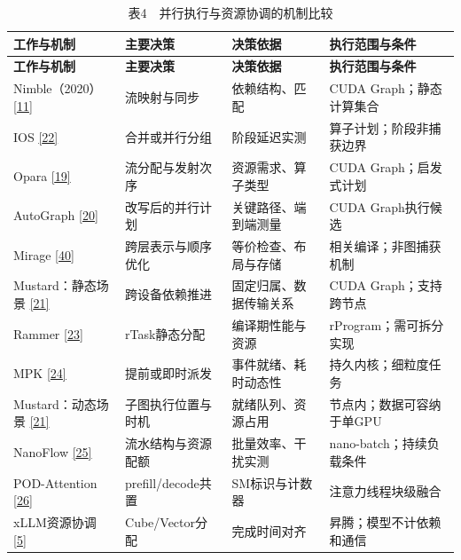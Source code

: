 \documentclass[UTF8,11pt,fontset=windows]{ctexart}
\begin{document}
\begingroup\small
\begin{longtable}[]{@{}>{\raggedright\arraybackslash}p{}>{\raggedright\arraybackslash}p{}>{\raggedright\arraybackslash}p{}>{\raggedright\arraybackslash}p{}@{}}
\caption{表4　并行执行与资源协调的机制比较}\tabularnewline
\toprule
\textbf{工作与机制} & \textbf{主要决策} & \textbf{决策依据} & \textbf{执行范围与条件} \\
\midrule
\endfirsthead
\toprule
\textbf{工作与机制} & \textbf{主要决策} & \textbf{决策依据} & \textbf{执行范围与条件} \\
\midrule
\endhead
Nimble（2020）\protect\hyperlink{ref-11}{{[}11{]}} & 流映射与同步 & 依赖结构、匹配 & CUDA Graph；静态计算集合 \\
IOS \protect\hyperlink{ref-22}{{[}22{]}} & 合并或并行分组 & 阶段延迟实测 & 算子计划；阶段非捕获边界 \\
Opara \protect\hyperlink{ref-19}{{[}19{]}} & 流分配与发射次序 & 资源需求、算子类型 & CUDA Graph；启发式计划 \\
AutoGraph \protect\hyperlink{ref-20}{{[}20{]}} & 改写后的并行计划 & 关键路径、端到端测量 & CUDA Graph执行候选 \\
Mirage \protect\hyperlink{ref-40}{{[}40{]}} & 跨层表示与顺序优化 & 等价检查、布局与存储 & 相关编译；非图捕获机制 \\
Mustard：静态场景 \protect\hyperlink{ref-21}{{[}21{]}} & 跨设备依赖推进 & 固定归属、数据传输关系 & CUDA Graph；支持跨节点 \\
Rammer \protect\hyperlink{ref-23}{{[}23{]}} & rTask静态分配 & 编译期性能与资源 & rProgram；需可拆分实现 \\
MPK \protect\hyperlink{ref-24}{{[}24{]}} & 提前或即时派发 & 事件就绪、耗时动态性 & 持久内核；细粒度任务 \\
Mustard：动态场景 \protect\hyperlink{ref-21}{{[}21{]}} & 子图执行位置与时机 & 就绪队列、资源占用 & 节点内；数据可容纳于单GPU \\
NanoFlow \protect\hyperlink{ref-25}{{[}25{]}} & 流水结构与资源配额 & 批量效率、干扰实测 & nano-batch；持续负载条件 \\
POD-Attention \protect\hyperlink{ref-26}{{[}26{]}} & prefill/decode共置 & SM标识与计数器 & 注意力线程块级融合 \\
xLLM资源协调 \protect\hyperlink{ref-5}{{[}5{]}} & Cube/Vector分配 & 完成时间对齐 & 昇腾；模型不计依赖和通信 \\
\bottomrule
\end{longtable}
\endgroup
\end{document}
